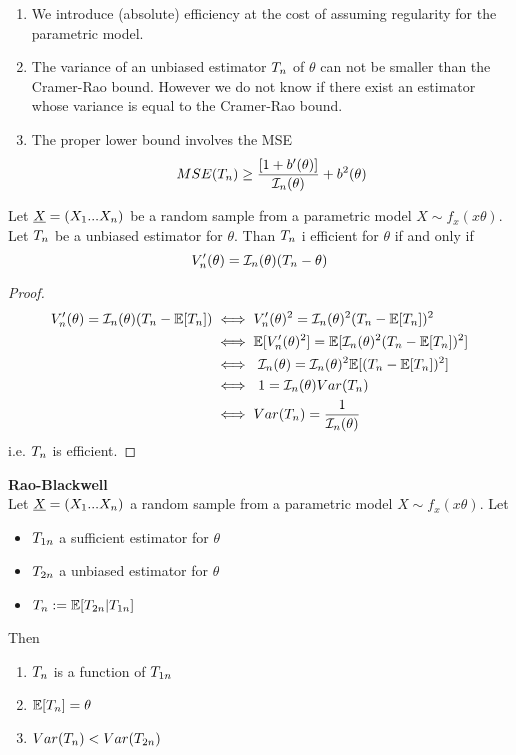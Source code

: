 \begin{oss}
	\begin{enumerate}
		\item We introduce (absolute) efficiency at the cost of assuming regularity for the parametric model.
		\item The variance of an unbiased estimator $T_{n}$ of $\theta$ can not be smaller than the Cramer-Rao bound. However we do not know if there exist an estimator whose variance is equal to the Cramer-Rao bound.
		\item The proper lower bound involves the MSE
		$$MSE(T_{n})\geq\frac{[1+b'(\theta)]}{\mathcal{I}_n(\theta)}+b^2(\theta)$$ 
\end{enumerate}
\end{oss}
\begin{prop}
	Let $\underline X=(X_1...X_n)$ be a random sample from a parametric model  $X\sim f_x(x\theta)$. Let $T_{n}$ be a unbiased estimator for $\theta$. Than $T_{n}$ i efficient for $\theta$ if and only if
	$$V_n'(\theta)=\mathcal{I}_n(\theta) (T_n-\theta)$$
\end{prop}
\begin{proof}
	\[
	\begin{split}
	V_n'(\theta)=\mathcal{I}_n(\theta) (T_{n}-\mathbb{E}[T_{n}])&
	\iff 	V_n'(\theta)^2=\mathcal{I}_n(\theta)^2 (T_{n}-\mathbb{E}[T_{n}])^2\\
	&\iff 	\mathbb{E}[V_n'(\theta)^2]=\mathbb{E}[\mathcal{I}_n(\theta)^2 (T_{n}-\mathbb{E}[T_{n}])^2]\\
	&\iff \ \mathcal{I}_n(\theta)=\mathcal{I}_n(\theta)^2 \mathbb{E}[(T_{n}-\mathbb{E}[T_{n}])^2]\\
	&\iff \ 1=\mathcal{I}_n(\theta) Var(T_{n})\\
	&\iff Var(T_{n})=\frac{1}{\mathcal{I}_n(\theta)}
	\end{split}
	\]
	i.e. $T_{n}$ is efficient.
\end{proof}
\begin{teo}
	\textbf{Rao-Blackwell}\\
	Let $\underline X=(X_1 ... X_n)$ a random sample from a parametric model  $X\sim f_x(x\theta)$. Let
	\begin{itemize}
		\item $T_{1n}$ a sufficient estimator for $\theta$
		\item $T_{2n}$ a unbiased estimator for $\theta$
		\item $T_{n}:=\mathbb{E}[T_{2n}|T_{1n}]$
	\end{itemize}
Then
\begin{enumerate}
	\item $T_{n}$ is a function of $T_{1n}$
	\item $\mathbb{E}[T_{n}]=\theta$
	\item $Var(T_{n})<Var(T_{2n})$
\end{enumerate}
\end{teo}

